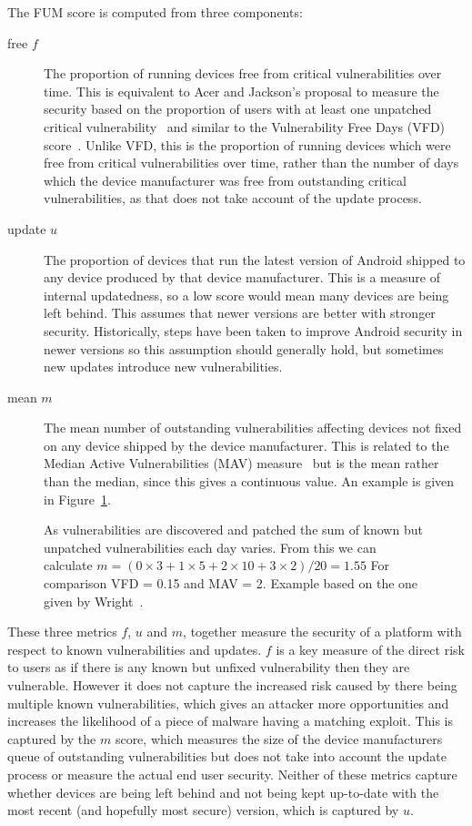 The FUM score is computed from three components:
\begin{description}
  \item[free $f$] The proportion of running devices free from critical vulnerabilities over time.
  This is equivalent to Acer and Jackson's proposal to measure the security based on the proportion of users with at least one unpatched critical vulnerability~\cite{Acer2010} and similar to the Vulnerability Free Days (VFD) score~\cite{Wright2014}.
  Unlike VFD, this is the proportion of running devices which were free from critical vulnerabilities over time, rather than the number of days which the device manufacturer was free from outstanding critical vulnerabilities, as that does not take account of the update process.
  \item[update $u$] The proportion of devices that run the latest version of Android shipped to any device produced by that device manufacturer.
  This is a measure of internal updatedness, so a low score would mean many devices are being left behind.
  This assumes that newer versions are better with stronger security.
  Historically, steps have been taken to improve Android security in newer versions so this assumption should generally hold, but sometimes new updates introduce new vulnerabilities.
  \item[mean $m$] The mean number of outstanding vulnerabilities affecting devices not fixed on any device shipped by the device manufacturer. This is related to the Median Active Vulnerabilities (MAV) measure~\cite{Wright2014} but is the mean rather than the median, since this gives a continuous value.
  An example is given in Figure~\ref{fig:mcalculation}.
\end{description}

\begin{figure}
\centering

\caption{As vulnerabilities are discovered and patched the sum of known but unpatched vulnerabilities each day varies. From this we can calculate $m = (0 \times 3 + 1 \times 5 + 2 \times 10 + 3 \times 2) / 20 = 1.55$ For comparison VFD = 0.15 and MAV = 2. Example based on the one given by Wright~\cite{Wright2014}.}
\label{fig:mcalculation}
\end{figure}

These three metrics $f$, $u$ and $m$, together measure the security of a platform with respect to known vulnerabilities and updates.
$f$ is a key measure of the direct risk to users as if there is any known but unfixed vulnerability then they are vulnerable.
However it does not capture the increased risk caused by there being multiple known vulnerabilities, which gives an attacker more opportunities and increases the likelihood of a piece of malware having a matching exploit.
This is captured by the $m$ score, which measures the size of the device manufacturers queue of outstanding vulnerabilities but does not take into account the update process or measure the actual end user security.
Neither of these metrics capture whether devices are being left behind and not being kept up-to-date with the most recent (and hopefully most secure) version, which is captured by $u$.

